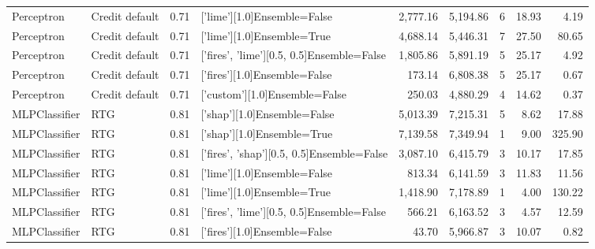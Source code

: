 \begin{tabular}{llrlrrlrr}
         Perceptron & Credit default &      0.71 &               ['lime'][1.0]Ensemble=False &   2,777.16 &                 5,194.86 &               6 &              18.93 &   4.19 \\
         Perceptron & Credit default &      0.71 &                ['lime'][1.0]Ensemble=True &   4,688.14 &                 5,446.31 &               7 &              27.50 &  80.65 \\
         Perceptron & Credit default &      0.71 & ['fires', 'lime'][0.5, 0.5]Ensemble=False &   1,805.86 &                 5,891.19 &               5 &              25.17 &   4.92 \\
         Perceptron & Credit default &      0.71 &              ['fires'][1.0]Ensemble=False &     173.14 &                 6,808.38 &               5 &              25.17 &   0.67 \\
         Perceptron & Credit default &      0.71 &             ['custom'][1.0]Ensemble=False &     250.03 &                 4,880.29 &               4 &              14.62 &   0.37 \\
      MLPClassifier &            RTG &      0.81 &               ['shap'][1.0]Ensemble=False &   5,013.39 &                 7,215.31 &               5 &               8.62 &  17.88 \\
      MLPClassifier &            RTG &      0.81 &                ['shap'][1.0]Ensemble=True &   7,139.58 &                 7,349.94 &               1 &               9.00 & 325.90 \\
      MLPClassifier &            RTG &      0.81 & ['fires', 'shap'][0.5, 0.5]Ensemble=False &   3,087.10 &                 6,415.79 &               3 &              10.17 &  17.85 \\
      MLPClassifier &            RTG &      0.81 &               ['lime'][1.0]Ensemble=False &     813.34 &                 6,141.59 &               3 &              11.83 &  11.56 \\
      MLPClassifier &            RTG &      0.81 &                ['lime'][1.0]Ensemble=True &   1,418.90 &                 7,178.89 &               1 &               4.00 & 130.22 \\
      MLPClassifier &            RTG &      0.81 & ['fires', 'lime'][0.5, 0.5]Ensemble=False &     566.21 &                 6,163.52 &               3 &               4.57 &  12.59 \\
      MLPClassifier &            RTG &      0.81 &              ['fires'][1.0]Ensemble=False &      43.70 &                 5,966.87 &               3 &              10.07 &   0.82 \\

\end{tabular}
